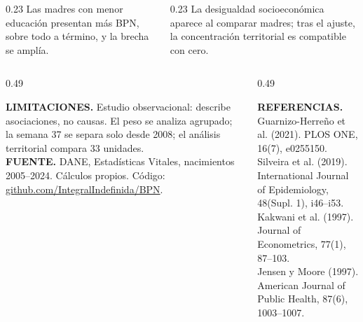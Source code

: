 \documentclass[final]{beamer}
\begin{document}
\begin{frame}[t]
\begin{tcolorbox}[colback=headerblue,colframe=headerblue,boxrule=0pt,arc=2.5mm,left=11mm,right=11mm,top=3mm,bottom=2mm]
\begin{columns}[t,totalwidth=\linewidth]
\begin{column}{0.23\linewidth}
Las madres con menor educación presentan más BPN, sobre todo a término, y la brecha se amplía.
\end{column}
\begin{column}{0.23\linewidth}
La desigualdad socioeconómica aparece al comparar madres; tras el ajuste, la concentración territorial es compatible con cero.
\end{column}
\end{columns}
\end{tcolorbox}
\vspace{-0.3cm}
\begin{columns}[t,totalwidth=\linewidth]
\begin{column}{0.49\linewidth}
\begin{tcolorbox}[colback=sidebarbg,colframe=sidebarbg,boxrule=0pt,arc=2.5mm,left=10mm,right=10mm,top=1.5mm,bottom=1.5mm]
{\footnotesize
\textbf{LIMITACIONES.} Estudio observacional: describe asociaciones, no causas. El peso se analiza agrupado; la semana 37 se separa solo desde 2008; el análisis territorial compara 33 unidades.\\[1mm]
\textbf{FUENTE.} DANE, Estadísticas Vitales, nacimientos 2005–2024. Cálculos propios. Código: \href{https://github.com/IntegralIndefinida/BPN}{github.com/IntegralIndefinida/BPN}.
}
\end{tcolorbox}
\end{column}
\begin{column}{0.49\linewidth}
\begin{tcolorbox}[colback=sidebarbg,colframe=sidebarbg,boxrule=0pt,arc=2.5mm,left=10mm,right=10mm,top=1.5mm,bottom=1.5mm]
{\footnotesize
\textbf{REFERENCIAS.}\\
Guarnizo-Herreño et al. (2021). PLOS ONE, 16(7), e0255150.\\
Silveira et al. (2019). International Journal of Epidemiology, 48(Supl. 1), i46–i53.\\
Kakwani et al. (1997). Journal of Econometrics, 77(1), 87–103.\\
Jensen y Moore (1997). American Journal of Public Health, 87(6), 1003–1007.
}
\end{tcolorbox}
\end{column}
\end{columns}
\end{frame}
\end{document}
